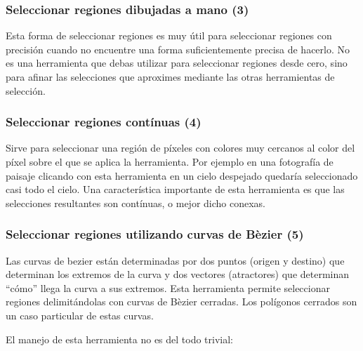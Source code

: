 \subsubsection{Seleccionar regiones dibujadas a mano (3)}

Esta  forma  de seleccionar  regiones  es  muy útil  para  seleccionar
regiones   con  precisión   cuando  \gimp   no  encuentre   una  forma
suficientemente precisa  de hacerlo. No  es una herramienta  que debas
utilizar  para  seleccionar  regiones  desde cero,  sino  para  afinar
las  selecciones  que aproximes  mediante  las  otras herramientas  de
selección.

\subsubsection{Seleccionar regiones contínuas (4)}

Sirve para seleccionar una región  de píxeles con colores muy cercanos
al color del píxel sobre el  que se aplica la herramienta. Por ejemplo
en una fotografía de paisaje clicando con esta herramienta en un cielo
despejado quedaría seleccionado casi todo el cielo. Una característica
importante de esta herramienta es  que las selecciones resultantes son
contínuas, o mejor dicho conexas.

\subsubsection{Seleccionar regiones utilizando curvas de Bèzier (5)}

Las  curvas de  bezier están  determinadas  por dos  puntos (origen  y
destino)  que determinan  los  extremos  de la  curva  y dos  vectores
(atractores) que  determinan ``cómo'' llega  la curva a  sus extremos.
Esta  herramienta  permite  seleccionar  regiones  delimitándolas  con
curvas  de  Bèzier  cerradas.  Los  polígonos  cerrados  son  un  caso
particular de estas curvas. 

El manejo de esta herramienta no es del todo trivial:

